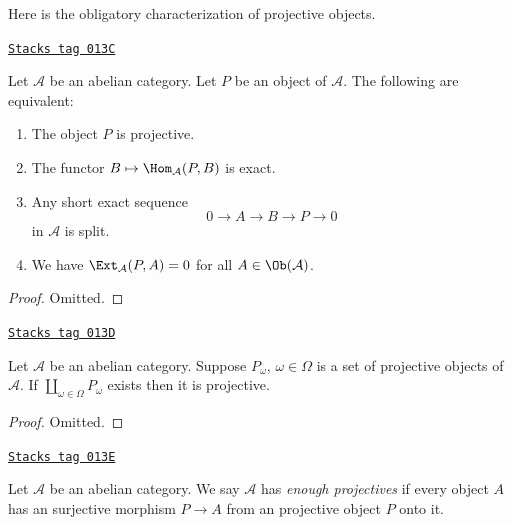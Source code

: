 Here is the obligatory characterization of projective objects.

\begin{lemma}
\label{homology-lemma-characterize-projectives}
\href{https://stacks.math.columbia.edu/tag/013C}{\texttt{Stacks tag 013C}}

Let $\mathcal{A}$ be an abelian category.
Let $P$ be an object of $\mathcal{A}$.
The following are equivalent:
\begin{enumerate}
\item The object $P$ is projective.
\item The functor $B \mapsto \Hom_\mathcal{A}(P, B)$
is exact.
\item Any short exact sequence
$$
0 \to A \to B \to P \to 0
$$
in $\mathcal{A}$ is split.
\item We have $\Ext_\mathcal{A}(P, A) = 0$ for
all $A \in \Ob(\mathcal{A})$.
\end{enumerate}
\end{lemma}

\begin{proof}
Omitted.
\end{proof}

\begin{lemma}
\label{homology-lemma-coproduct-projectives}
\href{https://stacks.math.columbia.edu/tag/013D}{\texttt{Stacks tag 013D}}

Let $\mathcal{A}$ be an abelian category.
Suppose $P_\omega$, $\omega \in \Omega$ is a set of projective
objects of $\mathcal{A}$. If $\coprod_{\omega \in \Omega} P_\omega$
exists then it is projective.
\end{lemma}

\begin{proof}
Omitted.
\end{proof}

\begin{definition}
\label{homology-definition-enough-projectives}
\href{https://stacks.math.columbia.edu/tag/013E}{\texttt{Stacks tag 013E}}

Let $\mathcal{A}$ be an abelian category.
We say $\mathcal{A}$ has {\it enough projectives}
if every object $A$ has an surjective morphism
$P \to A$ from an projective object $P$ onto it.
\end{definition}

